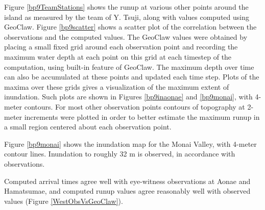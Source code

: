 
 
Figure \ref{bp9TeamStations} shows the runup at various other points around the island as measured by the team of Y. Tsuji, along with values computed using GeoClaw.  Figure \ref{bp9scatter} shows a scatter plot of the correlation between the observations and the computed values.  The GeoClaw values were obtained by placing a small fixed grid around each observation point and recording the maximum water depth at each point on this grid at each timestep of the computation, using built-in feature of GeoClaw.  The maximum depth over time can also be accumulated at these points and updated each time step.  Plots of the maxima over these grids gives a visualization of the maximum extent of inundation.  Such plots are shown  in Figures \ref{bp9inaonae} and \ref{bp9monai}, with 4-meter contours.  For most other observation  points contours of topography at 2-meter increments were plotted in order to better estimate the maximum runup in a small region centered about each observation point. 

Figure \ref{bp9monai} shows the inundation map for the Monai Valley, with 4-meter contour lines.  Inundation to roughly 32 m is observed, in accordance with observations.

Computed arrival times agree well with eye-witness observations at Aonae and Hamatsumae, and computed runup values agree reasonably well with observed values (Figure \ref{WestObsVsGeoClaw}).  

